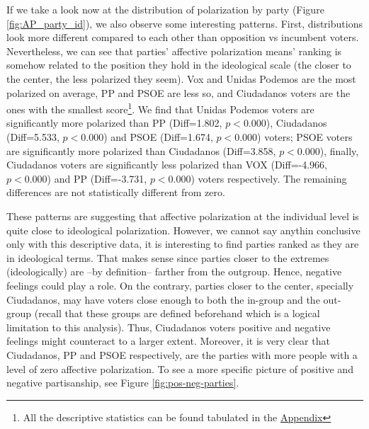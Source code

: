 \documentclass[a4paper, svgnames]{article}
\begin{document}
If we take a look now at the distribution of polarization by party (Figure \ref{fig:AP_party_id}), we also observe some interesting patterns. First, distributions look more different compared to each other than opposition vs incumbent voters. Nevertheless, we can see that parties' affective polarization means' ranking is somehow related to the position they hold in the ideological scale (the closer to the center, the less polarized they seem). Vox and Unidas Podemos are the most polarized on average, PP and PSOE are less so, and Ciudadanos voters are the ones with the smallest score\footnote{All the descriptive statistics can be found tabulated in the \hyperref[appendix]{Appendix}}. We find that Unidas Podemos voters are significantly more polarized than PP (Diff=1.802, $p<0.000$), Ciudadanos (Diff=5.533, $p<0.000$) and PSOE (Diff=1.674, $p<0.000$) voters; PSOE voters are significantly more polarized than Ciudadanos (Diff=3.858, $p<0.000$), finally, Ciudadanos voters are significantly less polarized than VOX (Diff=-4.966, $p<0.000$) and PP (Diff=-3.731, $p<0.000$) voters respectively. The remaining differences are not statistically different from zero.

These patterns are suggesting that affective polarization at the individual level is quite close to ideological polarization. However, we cannot say anythin conclusive only with this descriptive data, it is interesting to find parties ranked as they are in ideological terms. That makes sense since parties closer to the extremes (ideologically) are --by definition-- farther from the outgroup. Hence, negative feelings could play a role. On the contrary, parties closer to the center, specially Ciudadanos, may have voters close enough to both the in-group and the out-group (recall that these groups are defined beforehand which is a logical limitation to this analysis). Thus, Ciudadanos voters positive and negative feelings might counteract to a larger extent. Moreover, it is very clear that Ciudadanos, PP and PSOE respectively, are the parties with more people with a level of zero affective polarization. To see a more specific picture of positive and negative partisanship, see Figure \ref{fig:pos-neg-parties}.
\end{document}
